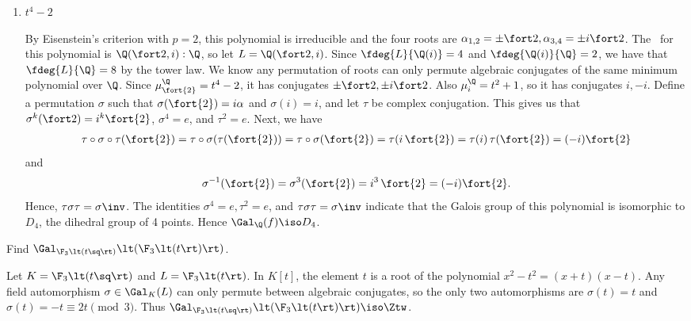 \documentclass{article}
\begin{document}
\begin{enumerate}
\item \( t^4-2 \)
  \begin{solution}
    By Eisenstein's criterion with \( p=2 \), this polynomial is irreducible and the four roots are \( \alpha_{1,2} = \pm\fort 2, \alpha_{3,4}=\pm i\fort 2 \).
    The \sfe~for this polynomial is \( \Q(\fort 2,i):\Q \), so let \( L = \Q(\fort 2, i) \).
    Since \( \fdeg{L}{\Q(i)} = 4 \) and \( \fdeg{\Q(i)}{\Q}=2 \), we have that \( \fdeg{L}{\Q} = 8 \) by the tower law.
    We know any permutation of roots can only permute algebraic conjugates of the same minimum polynomial over \( \Q \).
    Since \( \mu_{\fort{2}}^\Q=t^4-2 \), it has conjugates \( \pm\fort 2,\pm i\fort 2 \).
    Also \( \mu_i^\Q=t^2+1 \), so it has conjugates \( i,-i \).
    Define a permutation \( \sigma \) such that \( \sigma(\fort{2})=i\alpha \) and \( \sigma(i)=i \), and let \( \tau \) be complex conjugation.
    This gives us that \( \sigma^k(\fort 2) = i^k\fort{2} \), \( \sigma^4=e \), and \( \tau^2 = e \).
    Next, we have \begin{align*}
      \tau\circ\sigma\circ\tau(\fort{2})=\tau\circ\sigma(\tau(\fort{2}))=\tau\circ\sigma(\fort{2})=\tau(i\,\fort{2})=\tau(i)\,\tau(\fort{2})=(-i)\fort{2}
    \end{align*}
    and
    \begin{align*}
      \sigma^{-1}(\fort{2})=\sigma^3(\fort{2})= i^3\,\fort{2} = (-i)\fort{2}.
    \end{align*}
    Hence, \( \tau\sigma\tau = \sigma\inv \).
    The identities \( \sigma^4 = e,\tau^2 = e \), and \( \tau\sigma\tau = \sigma\inv \) indicate that the Galois group of this polynomial is isomorphic to \( D_4 \), the dihedral group of 4 points.
    Hence \( \Gal_\Q(f) \iso D_4 \).
  \end{solution}
\end{enumerate}

\begin{subexercise}
  Find \( \Gal_{\F_3\lt(t\sq\rt)}\lt(\F_3\lt(t\rt)\rt) \).
\end{subexercise}
\begin{solution}
  Let \( K = \F_3\lt(t\sq\rt) \) and \( L = \F_3\lt(t\rt) \).
  In \( K[t] \), the element \( t \) is a root of the polynomial \( x^2-t^2 = (x+t)(x-t) \).
  Any field automorphism \( \sigma\in \Gal_K(L) \) can only permute between algebraic conjugates, so the only two automorphisms are \( \sigma(t) = t \) and \( \sigma(t) = -t \equiv 2t \pmod 3 \).
  Thus \( \Gal_{\F_3\lt(t\sq\rt)}\lt(\F_3\lt(t\rt)\rt) \iso \Ztw \).
\end{solution}
\end{document}
